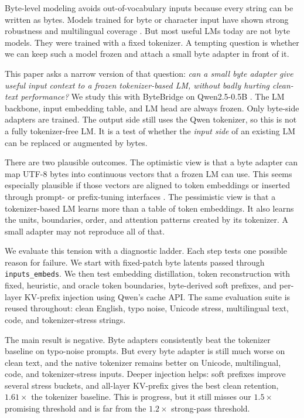 \documentclass{article}
\newcommand{\bb}{ByteBridge}
\newcommand{\qwen}{Qwen2.5-0.5B}
\begin{document}
Byte-level modeling avoids out-of-vocabulary inputs because every string can be written as bytes. Models trained for byte or character input have shown strong robustness and multilingual coverage \citep{xue2022byt5,clark2022canine,tay2022charformer,yu2023megabyte}. But most useful LMs today are not byte models. They were trained with a fixed tokenizer. A tempting question is whether we can keep such a model frozen and attach a small byte adapter in front of it.

This paper asks a narrow version of that question: \emph{can a small byte adapter give useful input context to a frozen tokenizer-based LM, without badly hurting clean-text performance?} We study this with \bb{} on \qwen{} \citep{qwen2025technical}. The LM backbone, input embedding table, and LM head are always frozen. Only byte-side adapters are trained. The output side still uses the Qwen tokenizer, so this is not a fully tokenizer-free LM. It is a test of whether the \emph{input side} of an existing LM can be replaced or augmented by bytes.

There are two plausible outcomes. The optimistic view is that a byte adapter can map UTF-8 bytes into continuous vectors that a frozen LM can use. This seems especially plausible if those vectors are aligned to token embeddings or inserted through prompt- or prefix-tuning interfaces \citep{li2021prefixtuning,lester2021prompttuning}. The pessimistic view is that a tokenizer-based LM learns more than a table of token embeddings. It also learns the units, boundaries, order, and attention patterns created by its tokenizer. A small adapter may not reproduce all of that.

We evaluate this tension with a diagnostic ladder. Each step tests one possible reason for failure. We start with fixed-patch byte latents passed through \texttt{inputs\_embeds}. We then test embedding distillation, token reconstruction with fixed, heuristic, and oracle token boundaries, byte-derived soft prefixes, and per-layer KV-prefix injection using Qwen's cache API. The same evaluation suite is reused throughout: clean English, typo noise, Unicode stress, multilingual text, code, and tokenizer-stress strings.

The main result is negative. Byte adapters consistently beat the tokenizer baseline on typo-noise prompts. But every byte adapter is still much worse on clean text, and the native tokenizer remains better on Unicode, multilingual, code, and tokenizer-stress inputs. Deeper injection helps: soft prefixes improve several stress buckets, and all-layer KV-prefix gives the best clean retention, $1.61\times$ the tokenizer baseline. This is progress, but it still misses our $1.5\times$ promising threshold and is far from the $1.2\times$ strong-pass threshold.
\end{document}
